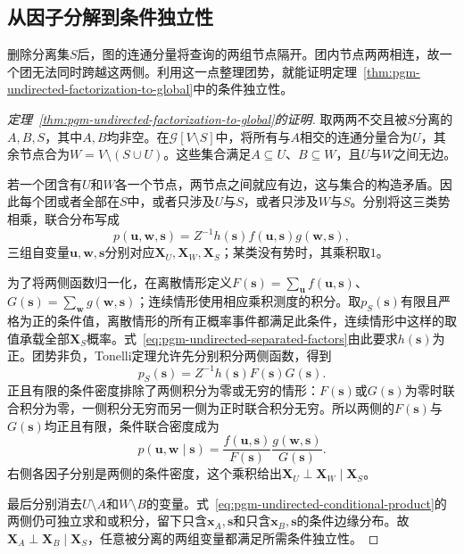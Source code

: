 \subsection{从因子分解到条件独立性}
\label{sec:pgm-undirected-factorization-to-markov}

删除分离集$S$后，图的连通分量将查询的两组节点隔开。团内节点两两相连，故一个团无法同时跨越这两侧。利用这一点整理团势，就能证明定理~\ref{thm:pgm-undirected-factorization-to-global}中的条件独立性。

\begin{proof}[定理~\ref{thm:pgm-undirected-factorization-to-global}的证明]
取两两不交且被$S$分离的$A,B,S$，其中$A,B$均非空。在$\mathcal{G}[V\setminus S]$中，将所有与$A$相交的连通分量合为$U$，其余节点合为$W=V\setminus(S\cup U)$。这些集合满足$A\subseteq U$、$B\subseteq W$，且$U$与$W$之间无边。

若一个团含有$U$和$W$各一个节点，两节点之间就应有边，这与集合的构造矛盾。因此每个团或者全部在$S$中，或者只涉及$U$与$S$，或者只涉及$W$与$S$。分别将这三类势相乘，联合分布写成
\begin{equation}
  p(\bm{u},\bm{w},\bm{s})
  =Z^{-1}h(\bm{s})f(\bm{u},\bm{s})g(\bm{w},\bm{s}),
  \label{eq:pgm-undirected-separated-factors}
\end{equation}
三组自变量$\bm{u},\bm{w},\bm{s}$分别对应$\bm{X}_U,\bm{X}_W,\bm{X}_S$；某类没有势时，其乘积取$1$。

为了将两侧函数归一化，在离散情形定义$F(\bm{s})=\sum_{\bm{u}}f(\bm{u},\bm{s})$、$G(\bm{s})=\sum_{\bm{w}}g(\bm{w},\bm{s})$；连续情形使用相应乘积测度的积分。取$p_S(\bm{s})$有限且严格为正的条件值，离散情形的所有正概率事件都满足此条件，连续情形中这样的取值承载全部$\bm{X}_S$概率。式~\eqref{eq:pgm-undirected-separated-factors}由此要求$h(\bm{s})$为正。团势非负，Tonelli定理允许先分别积分两侧函数，得到
\[
  p_S(\bm{s})=Z^{-1}h(\bm{s})F(\bm{s})G(\bm{s}).
\]
正且有限的条件密度排除了两侧积分为零或无穷的情形：$F(\bm{s})$或$G(\bm{s})$为零时联合积分为零，一侧积分无穷而另一侧为正时联合积分无穷。所以两侧的$F(\bm{s})$与$G(\bm{s})$均正且有限，条件联合密度成为
\begin{equation}
  p(\bm{u},\bm{w}\mid\bm{s})
  =\frac{f(\bm{u},\bm{s})}{F(\bm{s})}
   \frac{g(\bm{w},\bm{s})}{G(\bm{s})}.
  \label{eq:pgm-undirected-conditional-product}
\end{equation}
右侧各因子分别是两侧的条件密度，这个乘积给出$\bm{X}_U\perp\bm{X}_W\mid\bm{X}_S$。

最后分别消去$U\setminus A$和$W\setminus B$的变量。式~\eqref{eq:pgm-undirected-conditional-product}的两侧仍可独立求和或积分，留下只含$\bm{x}_A,\bm{s}$和只含$\bm{x}_B,\bm{s}$的条件边缘分布。故$\bm{X}_A\perp\bm{X}_B\mid\bm{X}_S$，任意被分离的两组变量都满足所需条件独立性。
\end{proof}


